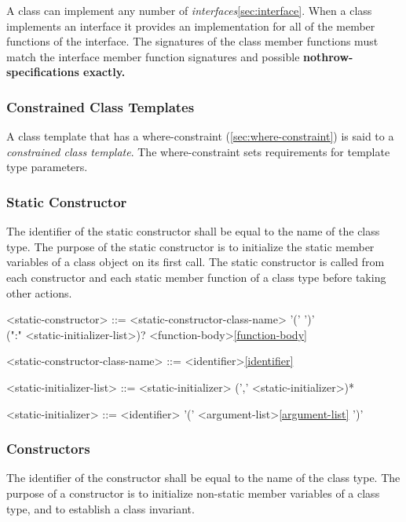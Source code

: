 \documentclass[a4paper,oneside,11pt]{article}
\begin{document}
A class can implement any number of \emph{interfaces}\ref{sec:interface}.
When a class implements an interface it provides an implementation for all of the member functions of the interface.
The signatures of the class member functions must match the interface member function signatures and possible \bf{nothrow}-specifications
exactly.

\subsubsection{Constrained Class Templates}

A class template that has a where-constraint (\ref{sec:where-constraint}) is said to a \emph{constrained class template}.
The where-constraint sets requirements for template type parameters.

\subsubsection{Static Constructor}

The identifier of the static constructor shall be equal to the name of the class type.
The purpose of the static constructor is to initialize the static member variables of a class object on its first call.
The static constructor is called from each constructor and each static member function of a class type
before taking other actions.

\begin{grammar}
\label{static-constructor}<static-constructor> ::=  <static-constructor-class-name> '(' ')'\\
(":" <static-initializer-list>)? <function-body>\ref{function-body}

<static-constructor-class-name> ::= <identifier>\ref{identifier}

<static-initializer-list> ::= <static-initializer> (',' <static-initializer>)*

<static-initializer> ::= <identifier> '(' <argument-list>\ref{argument-list} ')'
\end{grammar}

\subsubsection{Constructors}

The identifier of the constructor shall be equal to the name of the class type.
The purpose of a constructor is to initialize non-static member variables of a class type,
and to establish a class invariant.
\end{document}

